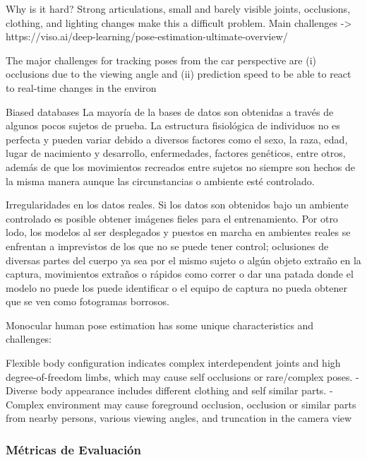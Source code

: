 Why is it hard?
Strong articulations, small and barely visible joints, occlusions, clothing, and lighting changes
make this a difficult problem.
Main challenges -> https://viso.ai/deep-learning/pose-estimation-ultimate-overview/

The major challenges for tracking poses from the car perspective are
(i) occlusions due to the viewing angle and (ii) prediction
speed to be able to react to real-time changes in the environ

Biased databases
La mayoría de la bases de datos son obtenidas a través de algunos pocos sujetos de prueba.
La estructura fisiológica de individuos no es perfecta y pueden variar debido a diversos factores
como el sexo, la raza, edad, lugar de nacimiento y desarrollo, enfermedades, factores genéticos, entre
otros, además de que los movimientos recreados entre sujetos no siempre son hechos de la misma manera
aunque las circunstancias o ambiente esté controlado.

Irregularidades en los datos reales.
Si los datos son obtenidos bajo un ambiente controlado es posible obtener imágenes fieles para el
entrenamiento. Por otro lodo, los modelos al ser desplegados y puestos en marcha en ambientes reales
se enfrentan a imprevistos de los que no se puede tener control; oclusiones de diversas partes del
cuerpo ya sea por el mismo sujeto o algún objeto extraño en la captura, movimientos extraños o rápidos
como correr o dar una patada donde el modelo no puede los puede identificar o el equipo de captura
no pueda obtener que se ven como fotogramas borrosos.

Monocular human pose estimation has some unique characteristics
and challenges:

Flexible body configuration indicates complex interdependent
joints and high degree-of-freedom limbs, which may cause self occlusions or rare/complex poses.
- Diverse body appearance includes different clothing and self similar parts.
- Complex environment may cause foreground occlusion, occlusion
or similar parts from nearby persons, various viewing angles, and
truncation in the camera view


\subsubsection{Métricas de Evaluación}


